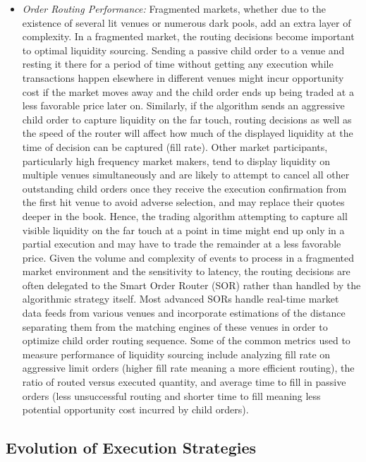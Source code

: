 \begin{itemize}
\item \emph{Order Routing Performance:} Fragmented markets, whether due to the existence of several lit venues or numerous dark pools, add an extra layer of complexity. In a fragmented market, the routing decisions become important to optimal liquidity sourcing. Sending a passive child order to a venue and resting it there for a period of time without getting any execution while transactions happen elsewhere in different venues might incur opportunity cost if the market moves away and the child order ends up being traded at a less favorable price later on. Similarly, if the algorithm sends an aggressive child order to capture liquidity on the far touch, routing decisions as well as the speed of the router will affect how much of the displayed liquidity at the time of decision can be captured (fill rate). Other market participants, particularly high frequency market makers, tend to display liquidity on multiple venues simultaneously and are likely to attempt to cancel all other outstanding child orders once they receive the execution confirmation from the first hit venue to avoid adverse selection, and may replace their quotes deeper in the book. Hence, the trading algorithm attempting to capture all visible liquidity on the far touch at a point in time might end up only in a partial execution and may have to trade the remainder at a less favorable price. Given the volume and complexity of events to process in a fragmented market environment and the sensitivity to latency, the routing decisions are often delegated to the Smart Order Router (SOR) rather than handled by the algorithmic strategy itself. Most advanced SORs handle real-time market data feeds from various venues and incorporate estimations of the distance separating them from the matching engines of these venues in order to optimize child order routing sequence. Some of the common metrics used to measure performance of liquidity sourcing include analyzing fill rate on aggressive limit orders (higher fill rate meaning a more efficient routing), the ratio of routed versus executed quantity, and average time to fill in passive orders (less unsuccessful routing and shorter time to fill meaning less potential opportunity cost incurred by child orders).
\end{itemize}



\subsection{Evolution of Execution Strategies}


